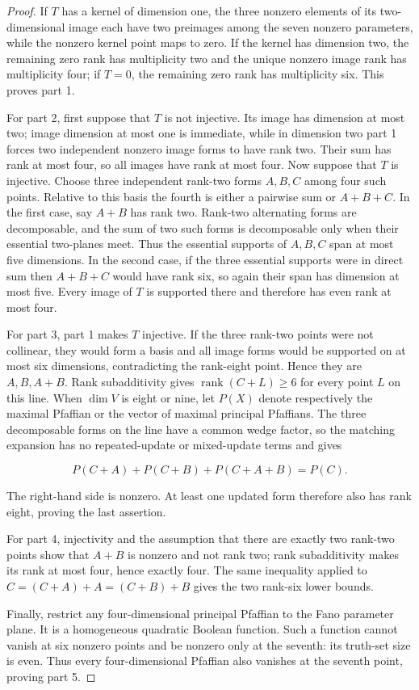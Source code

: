 \documentclass[11pt]{article}
\theoremstyle{remark}
\numberwithin{equation}{section}
\begin{document}
\begin{proof}
If \(T\) has a kernel of dimension one, the three nonzero elements of
its two-dimensional image each have two preimages among the seven nonzero
parameters, while the nonzero kernel point maps to zero. If the kernel has
dimension two, the remaining zero rank has multiplicity two and the unique
nonzero image rank has multiplicity four; if \(T=0\), the remaining zero rank
has multiplicity six. This proves part 1.

For part 2, first suppose that \(T\) is not injective. Its image has dimension
at most two; image dimension at most one is immediate, while in dimension two
part 1 forces two independent nonzero image forms to have rank two. Their sum
has rank at most four, so all images have rank at most four. Now suppose that
\(T\) is injective. Choose
three independent rank-two forms \(A,B,C\) among four such points. Relative to
this basis the fourth is either a pairwise sum or \(A+B+C\). In the first case,
say \(A+B\) has rank two. Rank-two alternating forms are decomposable, and the
sum of two such forms is decomposable only when their essential two-planes
meet. Thus the essential supports of \(A,B,C\) span at most five dimensions.
In the second case, if the three essential supports were in direct sum then
\(A+B+C\) would have rank six, so again their span has dimension at most five.
Every image of \(T\) is supported there and therefore has even rank at most
four.

For part 3, part 1 makes \(T\) injective. If the three rank-two points were not
collinear, they would form a basis and all image forms would be supported on at
most six dimensions, contradicting the rank-eight point. Hence they are
\(A,B,A+B\). Rank subadditivity gives
\(\operatorname{rank}(C+L)\ge6\) for every point \(L\) on this line. When
\(\dim V\) is eight or nine, let \(P(X)\) denote respectively the maximal
Pfaffian or the vector of maximal principal Pfaffians. The three decomposable
forms on the line have a common wedge factor, so the matching expansion has no
repeated-update or mixed-update terms and gives

\[
P(C+A)+P(C+B)+P(C+A+B)=P(C).
\]

The right-hand side is nonzero. At least one updated form therefore also has
rank eight, proving the last assertion.

For part 4, injectivity and the assumption that there are exactly two
rank-two points show that \(A+B\) is nonzero and not rank two; rank
subadditivity makes its rank at most four, hence exactly four. The same
inequality applied to \(C=(C+A)+A=(C+B)+B\) gives the two rank-six lower
bounds.

Finally, restrict any four-dimensional principal Pfaffian to the Fano parameter
plane. It is a homogeneous quadratic Boolean function. Such a function cannot
vanish at six nonzero points and be nonzero only at the seventh: its truth-set
size is even. Thus every four-dimensional Pfaffian also vanishes at the seventh
point, proving part 5.
\end{proof}
\end{document}
